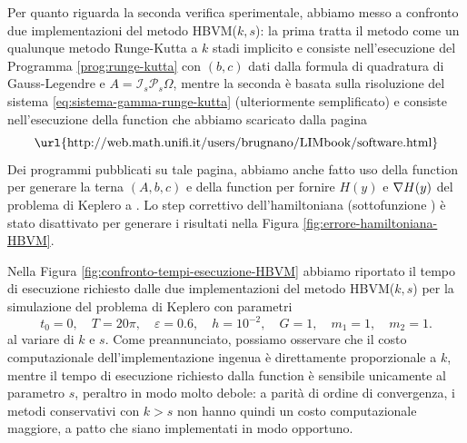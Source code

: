 Per quanto riguarda la seconda verifica sperimentale, abbiamo messo a
confronto due implementazioni del metodo HBVM($k,s$): la prima tratta
il metodo come un qualunque metodo Runge-Kutta a $k$ stadi implicito
e consiste nell'esecuzione del Programma \ref{prog:runge-kutta} con $(b,c)$ dati dalla
formula di quadratura di Gauss-Legendre e $A = \mathcal{I}_s \mathcal{P}_s \Omega$,
mentre la seconda è basata sulla risoluzione del sistema
\eqref{eq:sistema-gamma-runge-kutta} (ulteriormente semplificato)
e consiste nell'esecuzione della function  che abbiamo scaricato dalla pagina
\[
\text{\url{http://web.math.unifi.it/users/brugnano/LIMbook/software.html}}
\]
Dei programmi pubblicati su tale pagina, abbiamo anche fatto uso
della function  per generare la terna $(A,b,c)$
e della function  per fornire $H(y)$ e $\nabla H(y)$ del problema
di Keplero a . Lo step correttivo dell'hamiltoniana (sottofunzione
) è stato disattivato per generare i risultati nella
Figura \ref{fig:errore-hamiltoniana-HBVM}.

Nella Figura \ref{fig:confronto-tempi-esecuzione-HBVM} abbiamo riportato il tempo
di esecuzione richiesto dalle due implementazioni del metodo HBVM($k,s$)
per la simulazione del problema di Keplero con parametri
\[
t_0 = 0, \quad
T = 20\pi, \quad
\varepsilon = 0.6, \quad
h = 10^{-2}, \quad
G = 1, \quad
m_1 = 1, \quad
m_2 = 1.
\]
al variare di $k$ e $s$. Come preannunciato, possiamo osservare che
il costo computazionale dell'implementazione ingenua è direttamente proporzionale
a $k$, mentre il tempo di esecuzione richiesto dalla function
 è sensibile unicamente al parametro $s$, peraltro in modo
molto debole: a parità di ordine di convergenza,
i metodi conservativi con $k > s$ non hanno quindi un costo
computazionale maggiore, a patto che siano implementati in modo opportuno.


